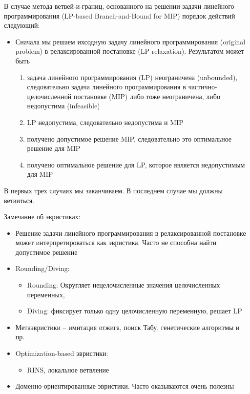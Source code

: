\documentclass[%
	11pt,
	a4paper,
	utf8,
		]{article}
\begin{document}
В случае метода ветвей-и-границ, основанного на решении задачи линейного программирования (LP-based Branch-and-Bound for MIP) порядок действий следующий:
\begin{itemize}
	\item Сначала мы решаем ихсодную задачу линейного программирования (original problem) в релаксированной постановке (LP relaxation). Результатом может быть
	\begin{enumerate}
		\item задача линейного программирования (LP) неограничена (unbounded), следовательно задача линейного программирования в частично-целочисленной постановке (MIP) либо тоже неограничена, либо недопустима (infeasible)
		
		\item LP недопустима, следовательно недопустима и MIP
		
		\item получено допустимое решение MIP, следовательно это оптимальное решение для MIP
		
		\item получено оптимальное решение для LP, которое является недопустимым для MIP
	\end{enumerate}
\end{itemize}

В первых трех случаях мы заканчиваем. В последнем случае мы должны ветвиться.


Замечание об эвристиках:
\begin{itemize}
	\item Решение задачи линейного программирования в релаксированной постановке может интерпретироваться как эвристика. Часто не способна найти допустимое решение
	
	\item Rounding/Diving:
	\begin{itemize}
		\item Rounding: Округляет нецелочисленные значения целочисленных переменных,
		
		\item Diving: фиксирует только одну целочисленную переменную, решает LP
	\end{itemize}

    \item Метаэвристики -- имитация отжига, поиск Табу, генетические алгоритмы и пр.
    
    \item Optimization-based эвристики:
    \begin{itemize}
    	\item RINS, локальное ветвление
    \end{itemize}

    \item Доменно-ориентированные эвристики. Часто оказываются очень полезны
\end{itemize}
\end{document}
